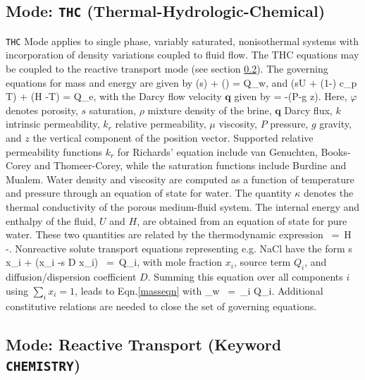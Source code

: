 \documentclass[12pt]{article}
\def\EQ#1\EN{\begin{equation}#1\end{equation}}
\newcommand{\eq}{\ =\ }
\newcommand{\p}{{\partial}}
\newcommand{\bnabla}{\boldsymbol{\nabla}}
\newcommand{\bq}{\boldsymbol{q}}
\begin{document}
\subsection{Mode: {\tt THC} (Thermal-Hydrologic-Chemical)}

{\tt THC} Mode applies to single phase, variably saturated, nonisothermal systems
with incorporation of density variations coupled to fluid flow. The THC equations may be coupled to the reactive transport mode (see section \ref{sec:chem}).
The governing equations for mass and energy are given by
\EQ\label{masseqn}
\frac{\p}{\p t}\left(\varphi s\rho\right) + \bnabla\cdot\left(\rho\bq\right) = Q_w,
\EN
and
\EQ
\frac{\p}{\p t}\left(\varphi s\rho U + (1-\varphi) c_p T\right) + \bnabla\cdot\left(\rho\bq H -\kappa \bnabla T\right) = Q_e,
\EN
with the Darcy flow velocity $\bq$ given by
\EQ
\bq = -\bnabla\left(P-\rho g z\right).
\EN
Here, $\varphi$ denotes porosity, $s$ saturation, $\rho$ mixture density of the brine, $\bq$ Darcy flux, $k$ intrinsic permeability, $k_r$ relative permeability, $\mu$ viscosity, $P$ pressure, $g$ gravity, and $z$ the vertical component of the position vector.  Supported relative permeability functions $k_r$ for Richards' equation include van Genuchten, Books-Corey and Thomeer-Corey, while the saturation functions include Burdine and Mualem.  Water density and viscosity are computed as a function of temperature and pressure through an equation of state for water. The quantity $\kappa$ denotes the thermal conductivity of the porous medium-fluid system. The internal energy and enthalpy of the fluid, $U$ and $H$, are obtained from an equation of state for pure water. These two quantities are related by the thermodynamic expression
\EQ
U \eq H -.
\EN
Nonreactive solute transport equations representing e.g. NaCl have the form
\EQ
\frac{\p}{\p t} \varphi s \rho x_i + \bnabla\cdot\Big(\bq \rho x_i -\varphi s D \rho\bnabla x_i\Big) \eq Q_i,
\EN
with mole fraction $x_i$, source term $Q_i$, and diffusion/dispersion coefficient $D$. Summing this equation over all components $i$ using $\sum_ix_i=1$, leads to Eqn.\eqref{masseqn} with
\EQ
Q_w \eq \sum_i Q_i.
\EN
Additional constitutive relations are needed to close the set of governing equations.

\subsection{Mode: Reactive Transport (Keyword {\tt CHEMISTRY})}\label{sec:chem}
\end{document}
